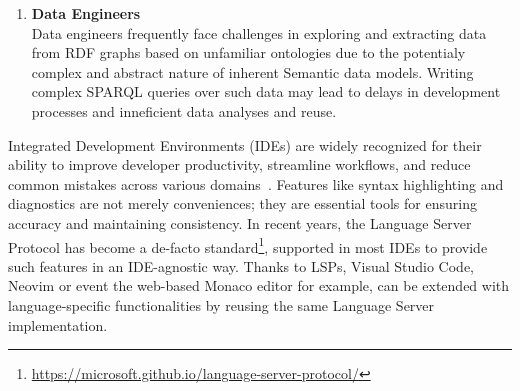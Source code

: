 \begin{enumerate}
  \item \textbf{Data Engineers}\\
    Data engineers frequently face challenges in exploring and extracting data from RDF graphs based on unfamiliar ontologies due to the potentialy complex and abstract nature of inherent Semantic data models.
    Writing complex SPARQL queries over such data may lead to delays in development processes and inneficient data analyses and reuse. 
\end{enumerate}

Integrated Development Environments (IDEs) are widely recognized for their ability to improve developer productivity, streamline workflows, and reduce common mistakes across various domains~\cite{javaEngineer}. 
Features like syntax highlighting and diagnostics are not merely conveniences; they are essential tools for ensuring accuracy and maintaining consistency. 
In recent years, the Language Server Protocol has become a de-facto standard\footnote{\url{https://microsoft.github.io/language-server-protocol/}}, supported in most IDEs to provide such features in an IDE-agnostic way.
Thanks to LSPs, Visual Studio Code, Neovim or event the web-based Monaco editor for example, can be extended with language-specific functionalities by reusing the same Language Server implementation.

